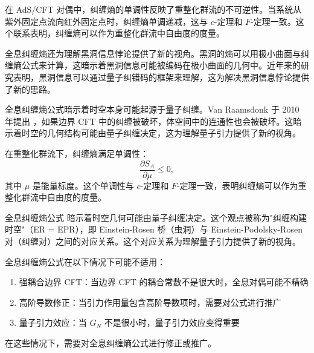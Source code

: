 \begin{note}[与重整化群流的关系]
在 AdS/CFT 对偶中，纠缠熵的单调性反映了重整化群流的不可逆性。当系统从紫外固定点流向红外固定点时，纠缠熵单调递减，这与 $c$-定理和 $F$-定理一致。这个联系表明，纠缠熵可以作为重整化群流中自由度的度量。
\end{note}

\begin{note}[与黑洞信息的关系]
全息纠缠熵还为理解黑洞信息悖论提供了新的视角。黑洞的熵可以用极小曲面与纠缠熵公式来计算，这暗示着黑洞信息可能被编码在极小曲面的几何中。近年来的研究表明，黑洞信息可以通过量子纠错码的框架来理解，这为解决黑洞信息悖论提供了新的思路。
\end{note}

\begin{note}[与量子引力的关系]
全息纠缠熵公式暗示着时空本身可能起源于量子纠缠。Van Raamsdonk 于 2010 年提出 \cite{VanRaamsdonk2010}，如果边界 CFT 中的纠缠被破坏，体空间中的连通性也会被破坏。这暗示着时空的几何结构可能由量子纠缠决定，这为理解量子引力提供了新的视角。
\end{note}

\begin{property}[纠缠熵的单调性]
在重整化群流下，纠缠熵满足单调性：
\begin{equation}
    \frac{\partial S_A}{\partial \mu} \leq 0,
\end{equation}
其中 $\mu$ 是能量标度。这个单调性与 $c$-定理和 $F$-定理一致，表明纠缠熵可以作为重整化群流中自由度的度量。
\end{property}

\begin{remark}[纠缠熵与时空几何]
全息纠缠熵公式 \cite{Ryu2006,Hubeny2007} 暗示着时空几何可能由量子纠缠决定。这个观点被称为"纠缠构建时空"（ER = EPR），即 Einstein-Rosen 桥（虫洞）与 Einstein-Podolsky-Rosen 对（纠缠对）之间的对应关系。这个对应关系为理解量子引力提供了新的视角。
\end{remark}

\begin{note}[全息纠缠熵的局限性]
全息纠缠熵公式在以下情况下可能不适用：
\begin{enumerate}
    \item 强耦合边界 CFT：当边界 CFT 的耦合常数不是很大时，全息对偶可能不精确
    \item 高阶导数修正：当引力作用量包含高阶导数项时，需要对公式进行推广
    \item 量子引力效应：当 $G_N$ 不是很小时，量子引力效应变得重要
\end{enumerate}
在这些情况下，需要对全息纠缠熵公式进行修正或推广。
\end{note}

